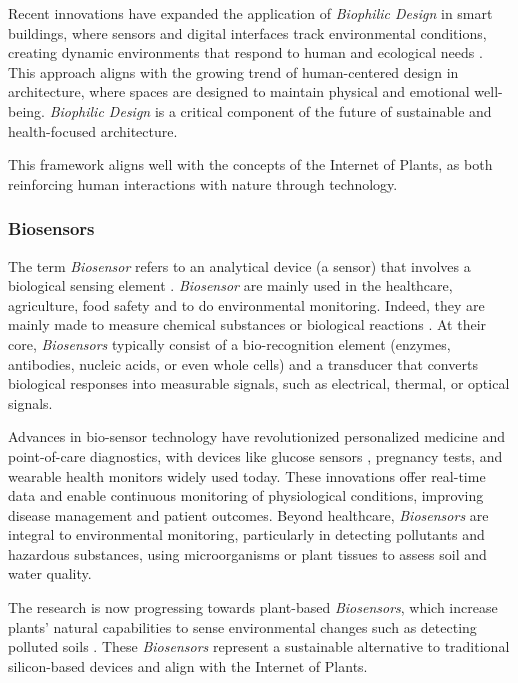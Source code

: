 Recent innovations have expanded the application of \textit{Biophilic Design} in smart buildings, where sensors and digital interfaces track environmental conditions, creating dynamic environments that respond to human and ecological needs \cite{gaoIntegratingUserCenteredDesign2023}. This approach aligns with the growing trend of human-centered design in architecture, where spaces are designed to maintain physical and emotional well-being. \textit{Biophilic Design} is a critical component of the future of sustainable and health-focused architecture.

This framework aligns well with the concepts of the Internet of Plants, as both reinforcing human interactions with nature through technology.

\subsubsection{Biosensors}

The term \textit{Biosensor} refers to an analytical device (a sensor) that involves a biological sensing element \cite{vigneshvarRecentAdvancesBiosensor2016}. \textit{Biosensor} are mainly used in the healthcare, agriculture, food safety and to do environmental monitoring. Indeed, they are mainly made to measure chemical substances or biological reactions \cite{zieglerBiosensorDevelopment1998}.
At their core, \textit{Biosensors} typically consist of a bio-recognition element (enzymes, antibodies, nucleic acids, or even whole cells) and a transducer that converts biological responses into measurable signals, such as electrical, thermal, or optical signals.

Advances in bio-sensor technology have revolutionized personalized medicine and point-of-care diagnostics, with devices like glucose sensors \cite{wangRecentDevelopmentsBlood2015}, pregnancy tests, and wearable health monitors widely used today. These innovations offer real-time data and enable continuous monitoring of physiological conditions, improving disease management and patient outcomes. Beyond healthcare, \textit{Biosensors} are integral to environmental monitoring, particularly in detecting pollutants and hazardous substances, using microorganisms or plant tissues to assess soil and water quality.

The research is now progressing towards plant-based \textit{Biosensors}, which increase plants' natural capabilities to sense environmental changes such as detecting polluted soils \cite{chincinskaLeafInfiltrationPlant2021}. These \textit{Biosensors} represent a sustainable alternative to traditional silicon-based devices and align with the Internet of Plants.



